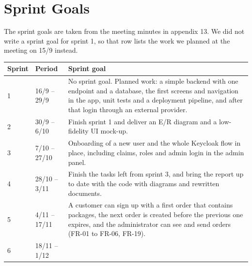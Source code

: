 \documentclass[a4paper,11pt]{article}
\begin{document}
\section*{Sprint Goals}
The sprint goals are taken from the meeting minutes in appendix 13. We did not write a sprint goal for sprint 1, so that row lists the work we planned at the meeting on 15/9 instead.

\begin{center}
\begin{tabular}{@{}llp{9cm}@{}}
Sprint & Period & Sprint goal \\ \hline
1 & 16/9 -- 29/9 & No sprint goal. Planned work: a simple backend with one endpoint and a database, the first screens and navigation in the app, unit tests and a deployment pipeline, and after that login through an external provider. \\
2 & 30/9 -- 6/10 & Finish sprint 1 and deliver an E/R diagram and a low-fidelity UI mock-up. \\
3 & 7/10 -- 27/10 & Onboarding of a new user and the whole Keycloak flow in place, including claims, roles and admin login in the admin panel. \\
4 & 28/10 -- 3/11 & Finish the tasks left from sprint 3, and bring the report up to date with the code with diagrams and rewritten documents. \\
5 & 4/11 -- 17/11 & A customer can sign up with a first order that contains packages, the next order is created before the previous one expires, and the administrator can see and send orders (FR-01 to FR-06, FR-19). \\
6 & 18/11 -- 1/12 & \\
\end{tabular}
\end{center}

\printbibliography
\end{document}
